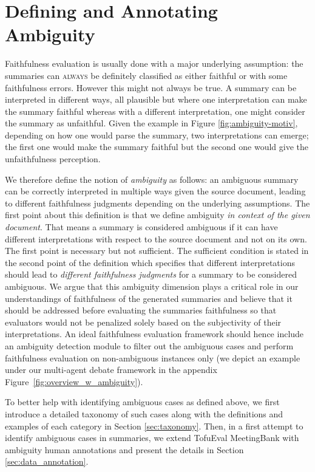 \section{Defining and Annotating Ambiguity}\label{sec:ambiguity}

Faithfulness evaluation is usually done with a major underlying assumption: the summaries can \textsc{always} be definitely classified as either faithful or with some faithfulness errors. However this might not always be true. A summary can be interpreted in different ways, all plausible but where one interpretation can make the summary faithful whereas with a different interpretation, one might consider the summary as unfaithful. Given the example in Figure \ref{fig:ambiguity-motiv}, depending on how one would parse the summary, two interpretations can emerge; the first one would make the summary faithful but the second one would give the unfaithfulness perception.

We therefore define the notion of \textit{ambiguity} as follows:
an ambiguous summary can be correctly interpreted in multiple ways given the source document, leading to different faithfulness judgments depending on the underlying assumptions.
% 
The first point about this definition is that we define ambiguity \textit{in context of the given document}. That means a summary is considered ambiguous if it can have different interpretations with respect to the source document and not on its own.
The first point is necessary but not sufficient. The sufficient condition is stated in the second point of the definition which specifies that different interpretations should lead to \textit{different faithfulness judgments} for a summary to be considered ambiguous. 
% 
We argue that this ambiguity dimension plays a critical role in our understandings of faithfulness of the generated summaries and believe that it should be addressed before evaluating the summaries faithfulness so that evaluators would not be penalized solely based on the subjectivity of their interpretations. 
An ideal faithfulness evaluation framework should hence include an ambiguity detection module to filter out the ambiguous cases and perform faithfulness evaluation on non-ambiguous instances only (we depict an example under our multi-agent debate framework in the appendix Figure~\ref{fig:overview_w_ambiguity}).

To better help with identifying ambiguous cases as defined above, we first introduce a detailed taxonomy of such cases along with the definitions and examples of each category in Section \ref{sec:taxonomy}. Then, in a first attempt to identify ambiguous cases in summaries, we extend TofuEval MeetingBank \cite{tang2024tofueval} with ambiguity human annotations and present the details in Section \ref{sec:data_annotation}.


